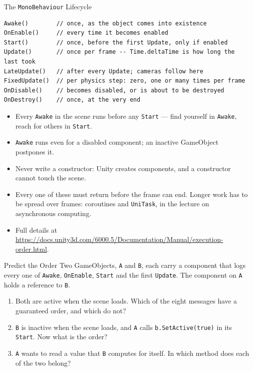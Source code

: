 \begin{frame}[fragile]{The \texttt{MonoBehaviour} Lifecycle}
    \begin{lstlisting}[basicstyle=\scriptsize\ttfamily]
Awake()        // once, as the object comes into existence
OnEnable()     // every time it becomes enabled
Start()        // once, before the first Update, only if enabled
Update()       // once per frame -- Time.deltaTime is how long the last took
LateUpdate()   // after every Update; cameras follow here
FixedUpdate()  // per physics step: zero, one or many times per frame
OnDisable()    // becomes disabled, or is about to be destroyed
OnDestroy()    // once, at the very end
    \end{lstlisting}
    \vspace{1ex}

    \begin{itemize}
        \item Every \texttt{Awake} in the scene runs before any \texttt{Start} ---
        find yourself in \texttt{Awake}, reach for others in \texttt{Start}.
        \item \texttt{Awake} runs even for a disabled component; an inactive
        GameObject postpones it.
        \item Never write a constructor: Unity creates components, and a
        constructor cannot touch the scene.
        \item Every one of these must return before the frame can end. Longer work
        has to be spread over frames: coroutines and \texttt{UniTask}, in the
        lecture on asynchronous computing.
        \item Full details at
        {\tiny \url{https://docs.unity3d.com/6000.5/Documentation/Manual/execution-order.html}}.
    \end{itemize}
\end{frame}

\begin{exerciseframe}{Predict the Order}
    Two GameObjects, \texttt{A} and \texttt{B}, each carry a component that logs
    every one of \texttt{Awake}, \texttt{OnEnable}, \texttt{Start} and the first
    \texttt{Update}. The component on \texttt{A} holds a reference to \texttt{B}.
    \vspace{1ex}

    \begin{enumerate}
        \item Both are active when the scene loads. Which of the eight messages
        have a guaranteed order, and which do not?
        \item \texttt{B} is inactive when the scene loads, and \texttt{A} calls
        \texttt{b.SetActive(true)} in its \texttt{Start}. Now what is the order?
        \item \texttt{A} wants to read a value that \texttt{B} computes for
        itself. In which method does each of the two belong?
    \end{enumerate}
    \vspace{1ex}

\end{exerciseframe}

